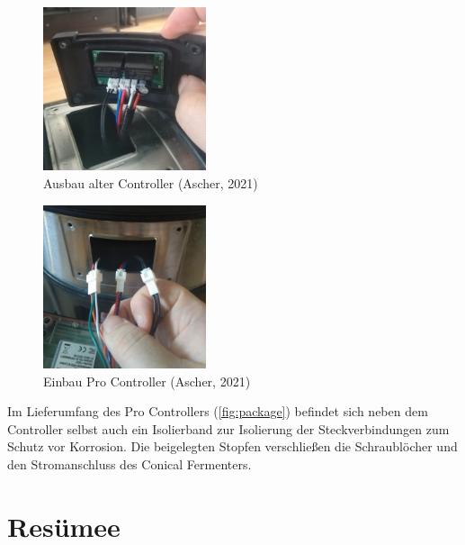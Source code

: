 \documentclass[a4paper,parskip=half]{scrartcl}
\begin{document}
\begin{figure}[H]
\centering
\includegraphics[width=4.8cm]{images/gfpc_install_old.jpg}
\caption{Ausbau alter Controller (Ascher, 2021)}
\label{fig:installold}
\end{figure}

\begin{figure}[H]
\centering
\includegraphics[width=4.8cm]{images/gfpc_install_new.jpg}
\caption{Einbau Pro Controller (Ascher, 2021)}
\label{fig:installnew}
\end{figure}

Im Lieferumfang des Pro Controllers (\autoref{fig:package})
befindet sich neben dem Controller selbst auch ein Isolierband
zur Isolierung der Steckverbindungen zum Schutz vor
Korrosion. Die beigelegten Stopfen verschließen die
Schraublöcher und den Stromanschluss des Conical Fermenters.

\section*{Resümee}
\end{document}
